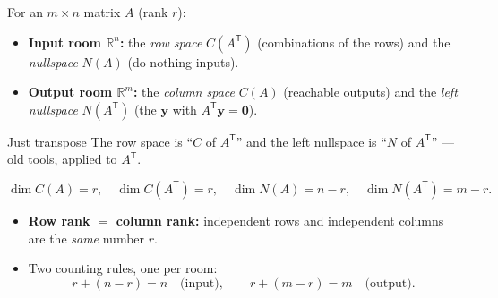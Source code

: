 \documentclass[aspectratio=169, 11pt]{beamer}
\newcommand{\yy}{\mathbf{y}}
\newcommand{\zero}{\mathbf{0}}
\newcommand{\T}{\mathsf{T}}
\begin{document}
\begin{frame}[t, plain]
  For an $m\times n$ matrix $A$ (rank $r$):
  \begin{itemize}
    \setlength{\itemsep}{5pt}
    \item \textbf{Input room $\mathbb{R}^n$:} the \emph{row space} $C(A^{\T})$ (combinations of the rows) and the \emph{nullspace} $N(A)$ (do-nothing inputs).
    \item \textbf{Output room $\mathbb{R}^m$:} the \emph{column space} $C(A)$ (reachable outputs) and the \emph{left nullspace} $N(A^{\T})$ (the $\yy$ with $A^{\T}\yy=\zero$).
  \end{itemize}
  \vspace{2pt}
  \begin{block}{Just transpose}
    The row space is ``$C$ of $A^{\T}$'' and the left nullspace is ``$N$ of $A^{\T}$'' --- old tools, applied to $A^{\T}$.
  \end{block}
\end{frame}

\begin{frame}[t, plain]
  \[
    \dim C(A)=r, \quad \dim C(A^{\T})=r, \quad \dim N(A)=n-r, \quad \dim N(A^{\T})=m-r.
  \]
  \begin{itemize}
    \setlength{\itemsep}{4pt}
    \item \textbf{Row rank $=$ column rank:} independent rows and independent columns are the \emph{same} number $r$.
    \item Two counting rules, one per room:
      \[ r+(n-r)=n \quad\text{(input)}, \qquad r+(m-r)=m \quad\text{(output)}. \]
  \end{itemize}
\end{frame}
\end{document}
